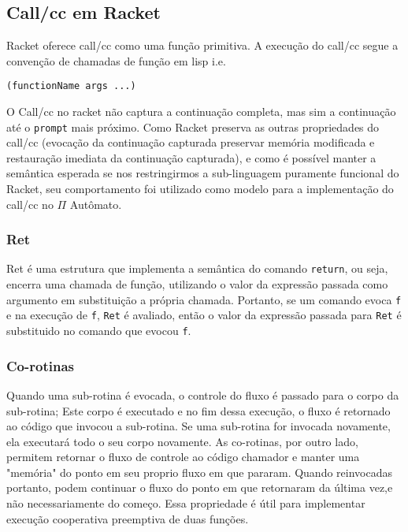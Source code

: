 \subsection{Call/cc em Racket}

Racket oferece call/cc como uma função primitiva. A execução do call/cc segue a convenção de chamadas de função em lisp i.e. 
\begin{lstlisting}
(functionName args ...)
\end{lstlisting}\cite{callccRacket}

O Call/cc no racket não captura a continuação completa, mas sim a continuação até o \texttt{prompt} mais próximo. Como Racket preserva as outras propriedades do call/cc (evocação da continuação capturada preservar memória modificada e restauração imediata da continuação capturada), e como é possível manter a semântica esperada se nos restringirmos a sub-linguagem puramente funcional do Racket, seu comportamento foi utilizado como modelo para a implementação do call/cc no $\Pi$ Autômato.
\subsubsection{Ret}
Ret é uma estrutura que implementa a semântica do comando \texttt{return}, ou seja, encerra uma chamada de função, utilizando o valor da expressão passada como argumento em substituição a própria chamada. Portanto, se um comando evoca \texttt{f} e na execução de \texttt{f}, \texttt{Ret} é avaliado, então o valor da expressão passada para \texttt{Ret} é substituido no comando que evocou \texttt{f}.

\subsubsection{Co-rotinas}
Quando uma sub-rotina é evocada, o controle do fluxo é passado para o corpo da sub-rotina; Este corpo é executado e no fim dessa execução, o fluxo é retornado ao código que invocou a sub-rotina. Se uma sub-rotina for invocada novamente, ela executará todo o seu corpo novamente. As co-rotinas, por outro lado, permitem retornar o fluxo de controle ao código chamador e manter uma "memória" do ponto em seu proprio fluxo em que pararam. Quando reinvocadas portanto, podem continuar o fluxo do ponto em que retornaram da última vez,e  não necessariamente do começo. Essa propriedade é útil para implementar execução cooperativa preemptiva de duas funções.